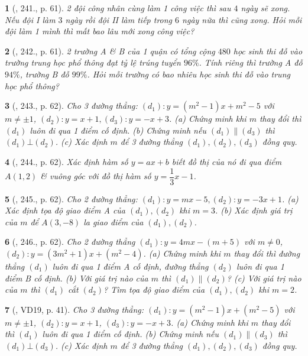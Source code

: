 \documentclass{article}
\newtheorem{baitoan}{}
\begin{document}
\begin{baitoan}[\cite{Tuyen_Toan_8}, 241., p. 61]
	2 đội công nhân cùng làm 1 công việc thì sau $4$ ngày sẽ xong. Nếu đội I làm $3$ ngày rồi đội II làm tiếp trong $6$ ngày nữa thì cũng xong. Hỏi mỗi đội làm 1 mình thì mất bao lâu mới xong công việc?
\end{baitoan}

\begin{baitoan}[\cite{Tuyen_Toan_8}, 242., p. 61]
	2 trường A \& B của 1 quận có tổng cộng $480$ học sinh thi đỗ vào trường trung học phổ thông đạt tỷ lệ trúng tuyển $96\%$. Tính riêng thì trường A đỗ $94\%$, trường B đỗ $99\%$. Hỏi mỗi trường có bao nhiêu học sinh thi đỗ vào trung học phổ thông?
\end{baitoan}

\begin{baitoan}[\cite{Tuyen_Toan_8}, 243., p. 62]
	Cho 3 đường thẳng: $(d_1):y = (m^2 - 1)x + m^2 - 5$ với $m\ne\pm1$, $(d_2):y = x + 1,(d_3):y = -x + 3$. (a) Chứng minh khi $m$ thay đổi thì $(d_1)$ luôn đi qua 1 điểm cố định. (b) Chứng minh nếu $(d_1)\parallel(d_3)$ thì $(d_1)\bot(d_2)$. (c) Xác định $m$ để 3 đường thẳng $(d_1),(d_2),(d_3)$ đồng quy.
\end{baitoan}

\begin{baitoan}[\cite{Tuyen_Toan_8}, 244., p. 62]
	Xác định hàm số $y = ax + b$ biết đồ thị của nó đi qua điểm $A(1,2)$ \& vuông góc với đồ thị hàm số $y = \dfrac{1}{3}x - 1$.
\end{baitoan}

\begin{baitoan}[\cite{Tuyen_Toan_8}, 245., p. 62]
	Cho 2 đường thẳng: $(d_1):y = mx - 5,(d_2):y = -3x + 1$. (a) Xác định tọa độ giao điểm A của $(d_1),(d_2)$ khi $m = 3$. (b) Xác định giá trị của $m$ để $A(3,-8)$ la giao điểm của $(d_1),(d_2)$.
\end{baitoan}

\begin{baitoan}[\cite{Tuyen_Toan_8}, 246., p. 62]
	Cho 2 đường thẳng $(d_1):y = 4mx - (m + 5)$ với $m\ne0$, $(d_2):y = (3m^2 + 1)x + (m^2 - 4)$. (a) Chứng minh khi $m$ thay đổi thì đường thẳng $(d_1)$ luôn đi qua 1 điểm A cố định, đường thẳng $(d_2)$ luôn đi qua 1 điểm B cố định. (b) Với giá trị nào của $m$ thì $(d_1)\parallel(d_2)$? (c) Với giá trị nào của $m$ thì $(d_1)$ cắt $(d_2)$? Tìm tọa độ giao điểm của $(d_1),(d_2)$ khi $m = 2$.
\end{baitoan}

\begin{baitoan}[\cite{Tuyen_Toan_9_old}, VD19, p. 41]
	Cho 3 đường thẳng: $(d_1):y = (m^2 - 1)x + (m^2 - 5)$ với $m\ne\pm1$, $(d_2):y = x + 1$, $(d_3):y = -x + 3$. (a) Chứng minh khi $m$ thay đổi thì $(d_1)$ luôn đi qua 1 điểm cố định. (b) Chứng minh nếu $(d_1)\parallel(d_3)$ thì $(d_1)\bot(d_3)$. (c) Xác định $m$ để 3 đường thẳng $(d_1),(d_2),(d_3)$ đồng quy.
\end{baitoan}
\end{document}
